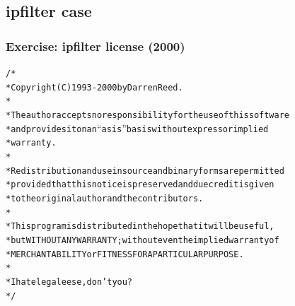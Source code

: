 \documentclass{beamer}
\begin{document}
\subsection{ipfilter case}
\begin{frame}
\frametitle{Exercise: ipfilter license (2000)}

\begin{alltt}
\footnotesize
/* \\
 * Copyright (C) 1993-2000 by Darren Reed. \\
 * \\
 * The author accepts no responsibility for the use of this software \\
 * and provides it on an ``as is'' basis without express or implied \\
 *  warranty. \\
 * \\
 * Redistribution and use in source and binary forms are permitted \\
 * provided that this notice is preserved and due credit is given \\
 * to the original author and the contributors. \\
 * \\
 * This program is distributed in the hope that it will be useful, \\
 * but WITHOUT ANY WARRANTY; without even the implied warranty of \\
 * MERCHANTABILITY or FITNESS FOR A PARTICULAR PURPOSE. \\
 * \\
 * I hate legaleese, don't you ? \\
 */

\end{alltt}

\end{frame}

\end{document}
